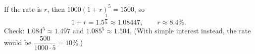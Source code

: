 If the rate is $r$, then $1000(1+r)^5=1500$, so
\[1+r=1.5^{\dfrac15}\approx1.08447,\qquad r\approx\boxed{8.4\%}.\]
Check: $1.084^5\approx1.497$ and $1.085^5\approx1.504$. (With simple interest instead, the rate would be $\dfrac{500}{1000\cdot5}=10\%$.)
